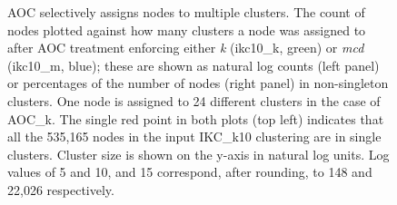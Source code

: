 \documentclass[12pt, oneside]{article}   	%
\begin{document}
\begin{figure}[H]
\begin{subfigure}[t]{0.48\textwidth}
\end{subfigure}
\captionsetup{width=0.9\textwidth}	
\caption{AOC selectively assigns nodes to multiple clusters. The count of nodes plotted against how many clusters a node was assigned to after AOC treatment enforcing either \emph{k} (ikc10\_k, green) or \emph{mcd} (ikc10\_m, blue);  these are shown as natural log counts (left panel) or percentages of the number of nodes (right panel) in non-singleton clusters. One node is assigned to 24 different clusters in the case of AOC\_k. The single red point in both plots (top left) indicates that all the 535,165 nodes in the input IKC\_k10 clustering are in single clusters. Cluster size is shown on the y-axis in natural log units. Log values of 5 and 10, and 15 correspond, after rounding, to 148 and 22,026 respectively.}
\label{fig:fig2}
\end{figure}
	
\end{document}
